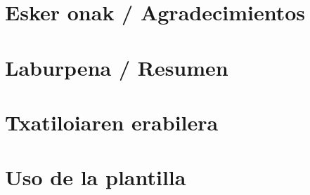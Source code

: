 \documentclass[a4page, 11pt, showtrims]{memoir}
\title{\izenburua}
\author{\egilea}
\date{\data}
\begin{document}
	
%




%
%
%

\cleardoublepage
\frontmatter


\chapter*{Esker onak / Agradecimientos}

\cleardoublepage


\chapter*{Laburpena / Resumen}

\cleardoublepage


\tableofcontents
\clearpage
\listoffigures
\clearpage
\listoftables
\clearpage
\listofalgorithms
{}



\cleardoublepage
\mainmatter
\pagestyle{ruled}

\chapter{Txatiloiaren erabilera} \label{ch:txantiloia}

\cleardoublepage
\chapter{Uso de la plantilla} \label{ch:plantilla}

\cleardoublepage
\end{document}
